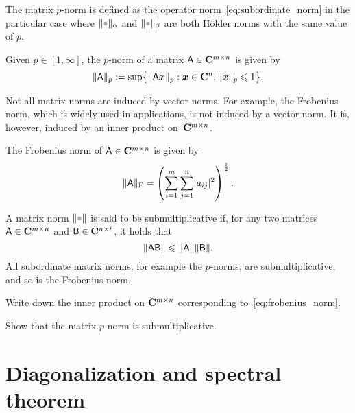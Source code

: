 The matrix $p$-norm is defined as the operator norm~\eqref{eq:subordinate_norm} in the particular case
where $\norm{\placeholder}_{\alpha}$ and $\norm{\placeholder}_{\beta}$ are both H\"older norms with the same value of $p$.
\begin{definition}
Given $p \in [1, \infty]$,
the $p$-norm of a matrix $\mathsf A \in \mathbf C^{m\times n}$ is given by
\begin{equation}
    \label{eq:matrix_p_norm}
    \lVert\mathsf A\rVert_{p} := \sup \bigl\{ \lVert\mathsf A \mathbf{\boldsymbol{x}}\rVert_{p} : \mathbf{\boldsymbol{x}} \in \mathbf C^n, \lVert\mathbf{\boldsymbol{x}}\rVert_{p} \leqslant 1 \bigr\}.
\end{equation}
\end{definition}
Not all matrix norms are induced by vector norms.
For example, the Frobenius norm,
which is widely used in applications,
is not induced by a vector norm.
It is, however, induced by an inner product on~$\mathbf C^{m \times n}$.
\begin{definition}
    The Frobenius norm of $\mathsf A \in \mathbf C^{m\times n}$ is given by
    \begin{equation}
        \label{eq:frobenius_norm}
        \lVert\mathsf A\rVert_{\rm F} = \left( \sum_{i=1}^{m} \sum_{j=1}^{n} \lvert a_{ij}\rvert^2 \right)^{\frac{1}{2}}.
    \end{equation}
\end{definition}

A matrix norm $\norm{\placeholder}$ is said to be submultiplicative if,
for any two matrices $\mathsf A \in \mathbf C^{m \times n}$ and $\mathsf B \in \mathbf C^{n \times \ell}$,
it holds that
\[
    \lVert\mathsf A \mathsf B\rVert \leqslant \lVert\mathsf A\rVert \lVert\mathsf B\rVert.
\]
All subordinate matrix norms,
for example the $p$-norms, are submultiplicative,
and so is the Frobenius norm.

\begin{exercise}
    Write down the inner product on $\mathbf C^{m \times n}$ corresponding to~\eqref{eq:frobenius_norm}.
\end{exercise}
\begin{exercise}
    Show that the matrix $p$-norm is submultiplicative.
\end{exercise}

\newpage
\section{Diagonalization and spectral theorem}%
\label{sec:diagonalization}


